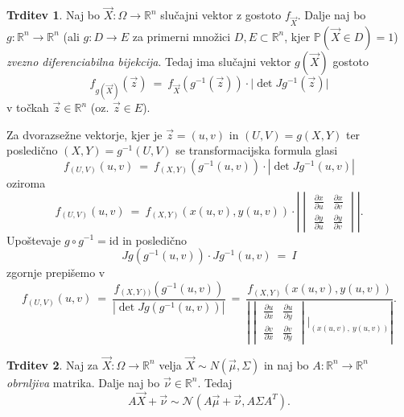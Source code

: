 \documentclass[11pt]{article}
\newcommand{\p}{\mathbb{P}}
\newcommand{\R}{\mathbb{R}}
\newcommand{\1}{\mathbbm{1}}
\newcommand{\n}{\mathcal{N}}
\theoremstyle{definition}
\theoremstyle{definition}
\newtheorem{trditev}{Trditev}[section]
\theoremstyle{definition}
\begin{document}
\begin{trditev}

Naj bo $\vec{X}: \Omega \rightarrow \R^n$ slučajni vektor z gostoto $f_{\vec{X}}$. Dalje naj bo $g: \R^n \rightarrow \R^n$ (ali $g: D \rightarrow E$ za primerni množici $D, E \subset \R^n$, kjer $\p(\vec{X} \in D) = 1$) \textit{zvezno diferenciabilna bijekcija}. Tedaj ima slučajni vektor $g(\vec{X})$ gostoto
$$f_{g(\vec{X})}(\vec{z}) ~=~ f_{\vec{X}} (g^{-1}(\vec{z})) \cdot |\det{Jg^{-1}(\vec{z})|}$$
v točkah $\vec{z} \in \R^n$ (oz. $\vec{z} \in E$).

Za dvorazsežne vektorje, kjer je $\vec{z} = (u, v)$ in $(U, V) = g(X, Y)$ ter posledično $(X, Y) = g^{-1}(U, V)$ se transformacijska formula glasi
$$f_{(U, V)}(u, v) ~=~ f_{(X ,Y)}(g^{-1}(u, v)) \cdot |\det{Jg^{-1}(u, v)}|$$
oziroma
$$f_{(U, V)}(u, v) ~=~ f_{(X, Y)}(x(u, v), y(u, v)) \cdot \left| \begin{vmatrix}
\frac{\partial x}{\partial u} & \frac{\partial x}{\partial v} \\
\frac{\partial y}{\partial u} & \frac{\partial y}{\partial v}
\end{vmatrix} \right|.$$
Upoštevaje $g \circ g^{-1} = \text{id}$ in posledično
$$Jg(g^{-1}(u, v)) \cdot Jg^{-1}(u, v) ~=~ I$$
zgornje prepišemo v
$$f_{(U, V)}(u, v) ~=~ \frac{f_{(X, Y))}(g^{-1}(u, v))}{|\det{Jg(g^{-1}(u, v))}|} ~=~ \frac{f_{(X, Y)}(x(u, v), y(u, v))}{\left| \begin{vmatrix}
\frac{\partial u}{\partial x} & \frac{\partial u}{\partial y} \\
\frac{\partial v}{\partial x} & \frac{\partial v}{\partial y}
\end{vmatrix} \Big|_{(x(u, v),~y(u, v))} \right|}.$$ 

\end{trditev}
\vspace{0.5cm}

\begin{trditev}

Naj za $\vec{X}: \Omega \rightarrow \R^n$ velja $\vec{X} \sim N(\vec{\mu}, \Sigma)$ in naj bo $A: \R^n \rightarrow \R^n$ \textit{obrnljiva} matrika. Dalje naj bo $\vec{\nu} \in \R^n$. Tedaj
$$A \vec{X} + \vec{\nu} \sim \n(A \vec{\mu} + \vec{\nu}, A \Sigma A^T).$$

\end{trditev}
\vspace{0.5cm}

\end{document}
